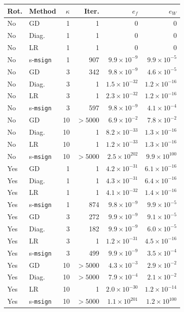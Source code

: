 \scriptsize
\setlength{\tabcolsep}{3pt}
\begin{tabular}{llrrrr}
\toprule
Rot. & Method & $\kappa$ & Iter. & $e_f$ & $e_W$ \\
\midrule
No & GD & 1 & 1 & $0$ & $0$ \\
No & Diag. & 1 & 1 & $0$ & $0$ \\
No & LR & 1 & 1 & $0$ & $0$ \\
No & s-\texttt{msign} & 1 & 907 & $9.9\times10^{-9}$ & $9.9\times10^{-5}$ \\
No & GD & 3 & 342 & $9.8\times10^{-9}$ & $4.6\times10^{-5}$ \\
No & Diag. & 3 & 1 & $1.5\times10^{-32}$ & $1.2\times10^{-16}$ \\
No & LR & 3 & 1 & $2.3\times10^{-32}$ & $1.2\times10^{-16}$ \\
No & s-\texttt{msign} & 3 & 597 & $9.8\times10^{-9}$ & $4.1\times10^{-4}$ \\
No & GD & 10 & $>5000$ & $6.9\times10^{-2}$ & $7.8\times10^{-2}$ \\
No & Diag. & 10 & 1 & $8.2\times10^{-33}$ & $1.3\times10^{-16}$ \\
No & LR & 10 & 1 & $1.2\times10^{-33}$ & $1.3\times10^{-16}$ \\
No & s-\texttt{msign} & 10 & $>5000$ & $2.5\times10^{202}$ & $9.9\times10^{100}$ \\
Yes & GD & 1 & 1 & $4.2\times10^{-31}$ & $6.1\times10^{-16}$ \\
Yes & Diag. & 1 & 1 & $4.3\times10^{-31}$ & $6.4\times10^{-16}$ \\
Yes & LR & 1 & 1 & $4.1\times10^{-32}$ & $1.4\times10^{-16}$ \\
Yes & s-\texttt{msign} & 1 & 874 & $9.8\times10^{-9}$ & $9.9\times10^{-5}$ \\
Yes & GD & 3 & 272 & $9.9\times10^{-9}$ & $9.1\times10^{-5}$ \\
Yes & Diag. & 3 & 182 & $9.9\times10^{-9}$ & $6.0\times10^{-5}$ \\
Yes & LR & 3 & 1 & $1.2\times10^{-31}$ & $4.5\times10^{-16}$ \\
Yes & s-\texttt{msign} & 3 & 499 & $9.9\times10^{-9}$ & $3.5\times10^{-4}$ \\
Yes & GD & 10 & $>5000$ & $4.3\times10^{-3}$ & $2.9\times10^{-2}$ \\
Yes & Diag. & 10 & $>5000$ & $7.9\times10^{-4}$ & $2.1\times10^{-2}$ \\
Yes & LR & 10 & 1 & $2.0\times10^{-30}$ & $1.2\times10^{-14}$ \\
Yes & s-\texttt{msign} & 10 & $>5000$ & $1.1\times10^{201}$ & $1.2\times10^{100}$ \\
\bottomrule
\end{tabular}
